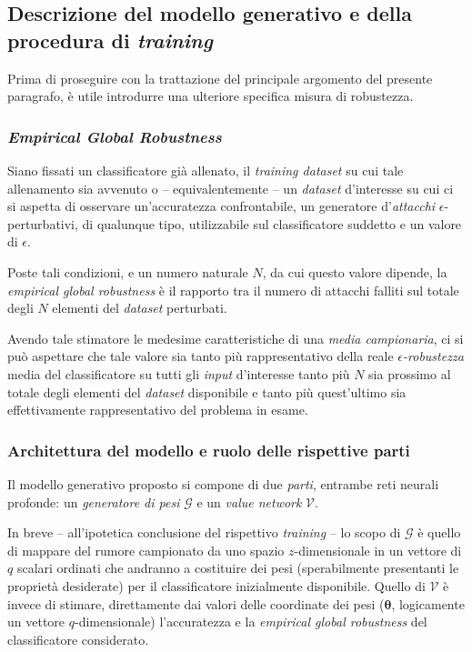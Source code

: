 \documentclass[a4paper, twoside]{article}
\begin{document}
\subsection{Descrizione del modello generativo e della procedura di \textit{training}}

Prima di proseguire con la trattazione del principale argomento del presente paragrafo, è utile introdurre una ulteriore specifica misura di robustezza.

\subsubsection{\textit{Empirical Global Robustness}}

Siano fissati un classificatore già allenato, il \textit{training dataset} su cui tale allenamento sia avvenuto o -- equivalentemente -- un \textit{dataset} d'interesse su cui ci si aspetta di osservare un'accuratezza confrontabile, un generatore d'\textit{attacchi} $\epsilon$-perturbativi, di qualunque tipo, utilizzabile sul classificatore suddetto e un valore di $\epsilon$.

Poste tali condizioni, e un numero naturale $N$, da cui questo valore dipende, la \textit{empirical global robustness} è il rapporto tra il numero di attacchi falliti sul totale degli $N$ elementi del \textit{dataset} perturbati.

Avendo tale stimatore le medesime caratteristiche di una \textit{media campionaria}, ci si può aspettare che tale valore sia tanto più rappresentativo della reale \textit{$\epsilon$-robustezza} media del classificatore su tutti gli \textit{input} d'interesse tanto più $N$ sia prossimo al totale degli elementi del \textit{dataset} disponibile e tanto più quest'ultimo sia effettivamente rappresentativo del problema in esame.

\subsubsection{Architettura del modello e ruolo delle rispettive parti}

Il modello generativo proposto si compone di due \textit{parti}, entrambe reti neurali profonde: un \textit{generatore di pesi} $\mathcal{G}$ e un \textit{value network} $\mathcal{V}$.

In breve -- all'ipotetica conclusione del rispettivo \textit{training} -- lo scopo di $\mathcal{G}$ è quello di mappare del rumore campionato da uno spazio $z$-dimensionale in un vettore di $q$ scalari ordinati che andranno a costituire dei pesi (sperabilmente presentanti le proprietà desiderate) per il classificatore inizialmente disponibile. Quello di $\mathcal{V}$ è invece di stimare, direttamente dai valori delle coordinate dei pesi ($\boldsymbol{\theta}$, logicamente un vettore $q$-dimensionale) l'accuratezza e la \textit{empirical global robustness} del classificatore considerato.
\end{document}
